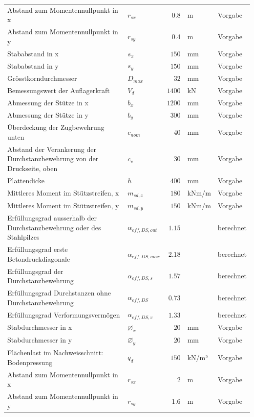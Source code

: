 \documentclass[11pt,a4paper]{article}
\begin{document}
\begin{xltabular}{\linewidth}{>{\raggedright\arraybackslash}Xlrll}
Abstand zum Momentennullpunkt in x & $r_{sx}$ & $0.8$ & m & Vorgabe \\
Abstand zum Momentennullpunkt in y & $r_{sy}$ & $0.4$ & m & Vorgabe \\
Stababstand in x & $s_x$ & $150$ & mm & Vorgabe \\
Stababstand in y & $s_y$ & $150$ & mm & Vorgabe \\
Grösstkorndurchmesser & $D_{max}$ & $32$ & mm & Vorgabe \\
Bemessungswert der Auflagerkraft & $V_d$ & $1400$ & kN & Vorgabe \\
Abmessung der Stütze in x & $b_x$ & $1200$ & mm & Vorgabe \\
Abmessung der Stütze in y & $b_y$ & $300$ & mm & Vorgabe \\
Überdeckung der Zugbewehrung unten & $c_{nom}$ & $40$ & mm & Vorgabe \\
Abstand der Verankerung der Durchstanzbewehrung von der Druckseite, oben & $c_v$ & $30$ & mm & Vorgabe \\
Plattendicke & $h$ & $400$ & mm & Vorgabe \\
Mittleres Moment im Stützstreifen, x & $m_{sd,x}$ & $180$ & kNm/m & Vorgabe \\
Mittleres Moment im Stützstreifen, y & $m_{sd,y}$ & $150$ & kNm/m & Vorgabe \\
Erfüllungsgrad ausserhalb der Durchstanzbewehrung oder des Stahlpilzes & $\alpha_{eff,DS,out}$ & $1.15$ &  & berechnet \\
Erfüllungsgrad erste Betondruckdiagonale & $\alpha_{eff,DS,max}$ & $2.18$ &  & berechnet \\
Erfüllungsgrad der Durchstanzbewehrung & $\alpha_{eff,DS,s}$ & $1.57$ &  & berechnet \\
Erfüllungsgrad Durchstanzen ohne Durchstanzbewehrung & $\alpha_{eff,DS}$ & $0.73$ &  & berechnet \\
Erfüllungsgrad Verformungsvermögen & $\alpha_{eff,DS,v}$ & $1.33$ &  & berechnet \\
Stabdurchmesser in x & $\varnothing_x$ & $20$ & mm & Vorgabe \\
Stabdurchmesser in y & $\varnothing_y$ & $20$ & mm & Vorgabe \\
Flächenlast im Nachweisschnitt: Bodenpressung & $q_d$ & $150$ & kN/m² & Vorgabe \\
Abstand zum Momentennullpunkt in x & $r_{sx}$ & $2$ & m & Vorgabe \\
Abstand zum Momentennullpunkt in y & $r_{sy}$ & $1.6$ & m & Vorgabe \\

\end{xltabular}
\end{document}
